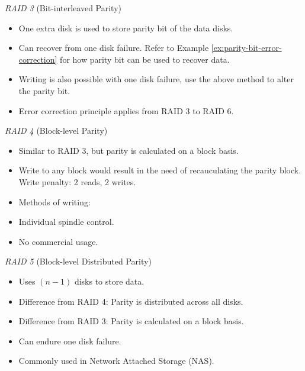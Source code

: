\emph{RAID 3} {\normalfont\large (Bit-interleaved Parity)}


\begin{itemize}
    \item One extra disk is used to store parity bit of the data disks.
    \item Can recover from one disk failure. Refer to Example \ref{ex:parity-bit-error-correction}
        for how parity bit can be used to recover data.
    \item Writing is also possible with one disk failure, use the above method to alter the
        parity bit.
    \item Error correction principle applies from RAID 3 to RAID 6.
\end{itemize}

\emph{RAID 4} {\normalfont\large (Block-level Parity)}

\begin{itemize}
    \item Similar to RAID 3, but parity is calculated on a block basis.
    \item Write to any block would result in the need of recauculating the parity block.
        Write penalty: 2 reads, 2 writes.
    \item Methods of writing: 
    \item Individual spindle control.
    \item No commercial usage.
\end{itemize}

\emph{RAID 5} {\normalfont\large (Block-level Distributed Parity)}

\begin{itemize}
    \item Uses $(n-1)$ disks to store data.
    \item Difference from RAID 4: Parity is distributed across all disks.
    \item Difference from RAID 3: Parity is calculated on a block basis.
    \item Can endure one disk failure.
    \item Commonly used in Network Attached Storage (NAS).
\end{itemize}

